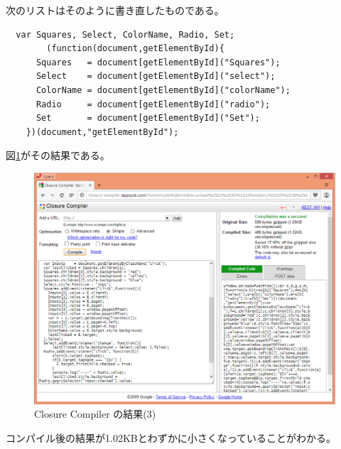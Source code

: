  次のリストはそのように書き直したものである。
\begin{Verbatim}
  var Squares, Select, ColorName, Radio, Set;
		(function(document,getElementById){
      Squares   = document[getElementById]("Squares");
      Select    = document[getElementById]("select");
      ColorName = document[getElementById]("colorName");
      Radio     = document[getElementById]("radio");
      Set       = document[getElementById]("Set");
	})(document,"getElementById");
\end{Verbatim}
図\ref{closure-compiler-res03}がその結果である。
 \begin{figure}[ht]
	\begin{center}
	 \includegraphics[width=1\textwidth]{10-01closur-compiler-res03.eps}
	\end{center}
 \caption{Closure Compiler の結果(3)}\label{closure-compiler-res03}
 \end{figure}
 コンパイル後の結果が1.02KBとわずかに小さくなっていることがわかる。

 